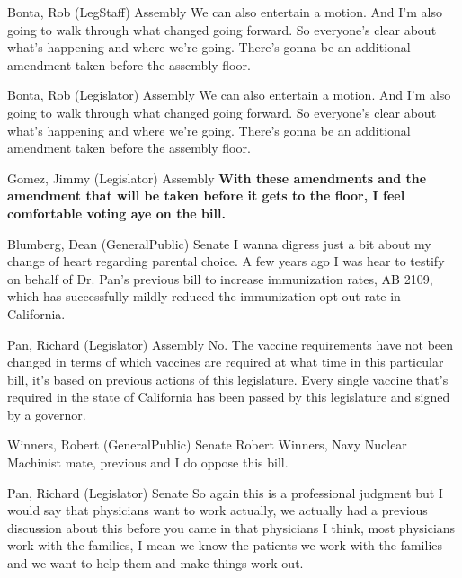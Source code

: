 \begin{result}{11.467769906103975}{Bonta, Rob (LegStaff) Assembly}
We can also entertain a motion. And I'm also going to walk through what changed going forward. So everyone's clear about what's happening and where we're going. There's gonna be an additional amendment taken before the assembly floor.
\end{result}

\begin{result}{11.467769906103975}{Bonta, Rob (Legislator) Assembly}
We can also entertain a motion. And I'm also going to walk through what changed going forward. So everyone's clear about what's happening and where we're going. There's gonna be an additional amendment taken before the assembly floor.
\end{result}

\begin{result}{9.968776745039438}{Gomez, Jimmy (Legislator) Assembly}
\textbf{With these amendments and the amendment that will be taken before it gets to the floor, I feel comfortable voting aye on the bill.
}\end{result}

\begin{result}{9.358442067508566}{Blumberg, Dean (GeneralPublic) Senate}
I wanna digress just a bit about my change of heart regarding parental choice. A few years ago I was hear to testify on behalf of Dr. Pan's previous bill to increase immunization rates, AB 2109, which has successfully mildly reduced the immunization opt-out rate in California.
\end{result}

\begin{result}{8.91434106058687}{Pan, Richard (Legislator) Assembly}
No. The vaccine requirements have not been changed in terms of which vaccines are required at what time in this particular bill, it's based on previous actions of this legislature. Every single vaccine that's required in the state of California has been passed by this legislature and signed by a governor.
\end{result}

\begin{result}{7.937499437047336}{Winners, Robert (GeneralPublic) Senate}
Robert Winners, Navy Nuclear Machinist mate, previous and I do oppose this bill.
\end{result}

\begin{result}{7.848895309967175}{Pan, Richard (Legislator) Senate}
So again this is a professional judgment but I would say that physicians want to work actually, we actually had a previous discussion about this before you came in that physicians I think, most physicians work with the families, I mean we know the patients we work with the families and we want to help them and make things work out.
\end{result}

